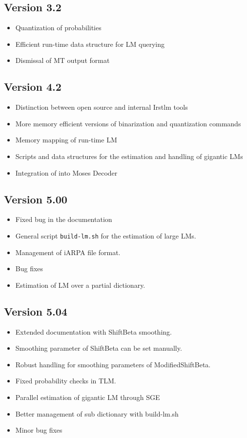 
\subsection{Version 3.2}
\begin{itemize}
\item Quantization of probabilities
\item Efficient run-time data structure for LM querying 
\item Dismissal of MT output format
\end{itemize}

\subsection{Version 4.2}
\begin{itemize}
\item Distinction between open source and internal Irstlm tools
\item More memory efficient versions of binarization and quantization commands
\item Memory mapping of run-time LM
\item Scripts and data structures for the estimation and handling of gigantic LMs 
\item Integration of {\IRSTLM} into Moses Decoder
\end{itemize}

\subsection{Version 5.00}
\begin{itemize}
\item Fixed bug in the documentation 
\item General script {\tt build-lm.sh} for the estimation of large LMs.
\item Management of iARPA file format.
\item Bug fixes
\item Estimation of LM over a partial dictionary.
\end{itemize}


\subsection{Version 5.04}
\begin{itemize}
\item Extended documentation with ShiftBeta smoothing. 
\item Smoothing parameter of ShiftBeta can be set manually.
\item Robust handling for smoothing parameters of ModifiedShiftBeta.
\item Fixed probability checks in TLM.
\item Parallel estimation of gigantic LM through SGE
\item Better management of sub dictionary with build-lm.sh   
\item Minor bug fixes
\end{itemize}

